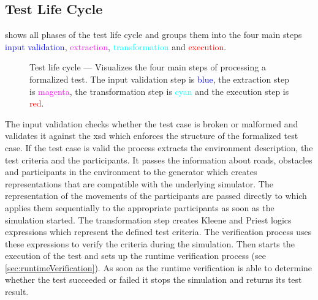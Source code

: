 \subsection{Test Life Cycle}\label{sec:testCycle}
 shows all phases of the test life cycle and groups them into the four main steps \textcolor{blue}{input validation}, \textcolor{magenta}{extraction}, \textcolor{cyan}{transformation} and \textcolor{red}{execution}.\\
\begin{figure}
    \centering
    
    \medskip
    \caption{%
        Test life cycle --- Visualizes the four main steps of processing a formalized test.
        The input validation step is \textcolor{blue}{blue}, the extraction step is \textcolor{magenta}{magenta}, the transformation step is \textcolor{cyan}{cyan} and the execution step is \textcolor{red}{red}.
    }\label{fig:testCycle}
\end{figure}
The input validation checks whether the test case is broken or malformed and validates it against the \gls{xsd} which enforces the structure of the formalized test case.
If the test case is valid the process extracts the environment description, the test criteria and the participants.
It passes the information about roads, obstacles and participants in the environment to the generator which creates representations that are compatible with the underlying simulator.
The representation of the movements of the participants are passed directly to \beamng{} which applies them sequentially to the appropriate participants as soon as the simulation started.
The transformation step creates Kleene and Priest logics expressions which represent the defined test criteria.
The verification process uses these expressions to verify the criteria during the simulation.
Then \beamng{} starts the execution of the test and sets up the runtime verification process (see \cref{sec:runtimeVerification}).
As soon as the runtime verification is able to determine whether the test succeeded or failed it stops the simulation and returns its test result.

